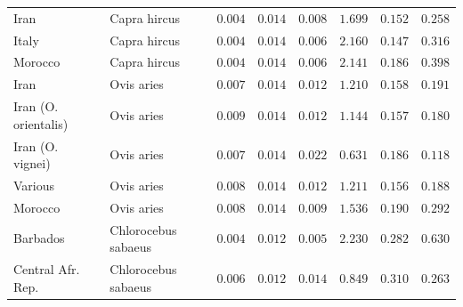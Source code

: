 \documentclass{article}
\begin{document}
\begin{center}
\begin{longtable*}{|l|l|r|r|r|r|r|r|}
             Iran &        Capra hircus &               $ 0.004$ &              $ 0.014$ &              $ 0.008$ &                                          $ 1.699$ &                         $ 0.152$ &                      $ 0.258$ \\
             Italy &        Capra hircus &               $ 0.004$ &              $ 0.014$ &              $ 0.006$ &                                          $ 2.160$ &                         $ 0.147$ &                      $ 0.316$ \\
             Morocco &        Capra hircus &               $ 0.004$ &              $ 0.014$ &              $ 0.006$ &                                          $ 2.141$ &                         $ 0.186$ &                      $ 0.398$ \\
            Iran &          Ovis aries &               $ 0.007$ &              $ 0.014$ &              $ 0.012$ &                                          $ 1.210$ &                         $ 0.158$ &                      $ 0.191$ \\
            Iran (O. orientalis) &          Ovis aries &               $ 0.009$ &              $ 0.014$ &              $ 0.012$ &                                          $ 1.144$ &                         $ 0.157$ &                      $ 0.180$ \\
            Iran (O. vignei) &          Ovis aries &               $ 0.007$ &              $ 0.014$ &              $ 0.022$ &                                          $ 0.631$ &                         $ 0.186$ &                      $ 0.118$ \\
            Various &          Ovis aries &               $ 0.008$ &              $ 0.014$ &              $ 0.012$ &                                          $ 1.211$ &                         $ 0.156$ &                      $ 0.188$ \\
            Morocco &          Ovis aries &               $ 0.008$ &              $ 0.014$ &              $ 0.009$ &                                          $ 1.536$ &                         $ 0.190$ &                      $ 0.292$ \\
             Barbados & Chlorocebus sabaeus &               $ 0.004$ &              $ 0.012$ &              $ 0.005$ &                                          $ 2.230$ &                         $ 0.282$ &                      $ 0.630$ \\
             Central Afr. Rep. & Chlorocebus sabaeus &               $ 0.006$ &              $ 0.012$ &              $ 0.014$ &                                          $ 0.849$ &                         $ 0.310$ &                      $ 0.263$ \\

\end{longtable*}
\end{center}
\end{document}
